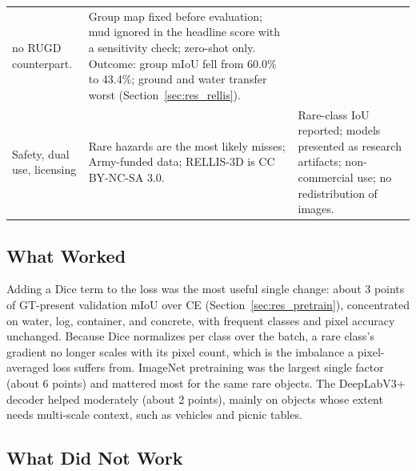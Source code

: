 \begin{table}[t]
\begin{tabular}{@{}p{2.9cm} p{6.7cm} p{7.2cm}@{}}
      no RUGD counterpart. &
      Group map fixed before evaluation; mud ignored in the headline score with
      a sensitivity check; zero-shot only. Outcome: group mIoU fell from 60.0\% to
      43.4\%; ground and water transfer worst (Section~\ref{sec:res_rellis}). \\
    Safety, dual use, licensing &
      Rare hazards are the most likely misses; Army-funded data;
      RELLIS-3D is CC BY-NC-SA 3.0. &
      Rare-class IoU reported; models presented as research artifacts;
      non-commercial use; no redistribution of images. \\
    \bottomrule
  \end{tabular}
\end{table}

\subsection{What Worked}

Adding a Dice term to the loss was the most useful single change: about 3
points of GT-present validation mIoU over CE (Section~\ref{sec:res_pretrain}),
concentrated on water, log, container, and concrete, with frequent classes
and pixel accuracy unchanged. Because Dice normalizes per class over the
batch, a rare class's gradient no longer scales with its pixel count, which
is the imbalance a pixel-averaged loss suffers from. ImageNet pretraining was
the largest single factor (about 6 points) and mattered most for the same
rare objects. The DeepLabV3+ decoder helped moderately (about 2 points),
mainly on objects whose extent needs multi-scale context, such as vehicles
and picnic tables.

\subsection{What Did Not Work}

